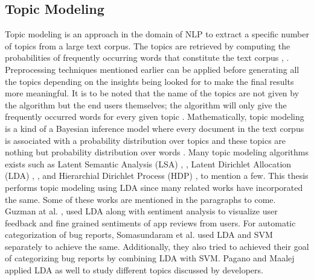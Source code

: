 \documentclass[a4paper,12pt,twoside]{report}
\begin{document}
\subsection{Topic Modeling}
Topic modeling is an approach in the domain of NLP to extract a specific number of topics from a large text corpus. The topics are retrieved by computing the probabilities of frequently occurring words that constitute the text corpus \cite{Zou2017}, \cite{Linstead2007}. Preprocessing techniques mentioned earlier can be applied before generating all the topics depending on the insights being looked for to make the final results more meaningful. It is to be noted that the name of the topics are not given by the algorithm but the end users themselves; the algorithm will only give the frequently occurred words for every given topic \cite{Goel2017}.
\newline \newline
Mathematically, topic modeling is a kind of a Bayesian inference model where every document in the text corpus is associated with a probability distribution over topics and these topics are nothing but probability distribution over words \cite{Goel2017}. Many topic modeling algorithms exists such as Latent Semantic Analysis (LSA) \cite{Agung2017}, \cite{Tu2017}, Latent Dirichlet Allocation (LDA) \cite{Katsumata2016}, \cite{Chen2016}, and Hierarchial Dirichlet Process (HDP) \cite{Li2018}, \cite{Hu2017} to mention a few. This thesis performs topic modeling using LDA since many related works have incorporated the same. Some of these works are mentioned in the paragraphs to come. 
\newline \newline
Guzman at al. \cite{Guzman2015}, \cite{Guzman2014} used LDA along with sentiment analysis to visualize user feedback and fine grained sentiments of app reviews from users. For automatic categorization of bug reports, Somasundaram et al. \cite{Somasundaram2012} used LDA and SVM separately to achieve the same. Additionally, they also tried to achieved their goal of categorizing bug reports by combining LDA with SVM. Pagano and Maalej\cite{Pagano2011} applied LDA as well to study different topics discussed by developers. 

\end{document}
